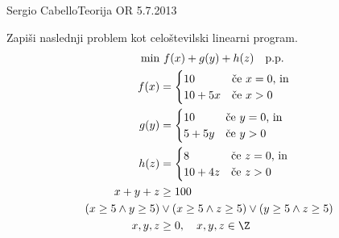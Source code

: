 \begin{naloga}{Sergio Cabello}{Teorija OR 5.7.2013}
\begin{vprasanje}
Zapiši naslednji problem kot celoštevilski linearni program.
\begin{align*}
\min &\ f(x) + g(y) + h(z) \quad \text{p.p.} \\
f(x) &= \begin{cases}
        10      & \text{če $x = 0$, in} \\
        10 + 5x & \text{če $x > 0$}
        \end{cases} \\
g(y) &= \begin{cases}
        10     & \text{če $y = 0$, in} \\
        5 + 5y & \text{če $y > 0$}
        \end{cases} \\
h(z) &= \begin{cases}
        8       & \text{če $z = 0$, in} \\
        10 + 4z & \text{če $z > 0$}
        \end{cases} \\
x + y + z &\ge 100 \\
      (x \ge 5 \land y \ge 5)
&\lor (x \ge 5 \land z \ge 5)
 \lor (y \ge 5 \land z \ge 5) \\
x, y, z &\ge 0, \quad x, y, z \in \Z
\end{align*}
\end{vprasanje}


\end{naloga}
